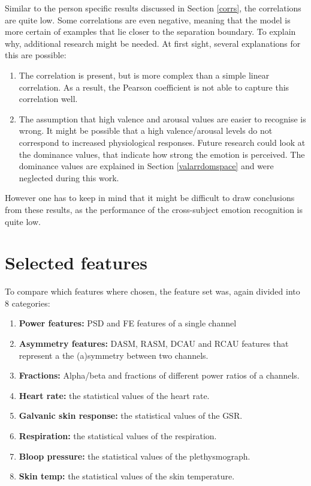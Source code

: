 Similar to the person specific results discussed in Section \ref{corrs}, the correlations are quite low. Some correlations are even negative, meaning that the model is more certain of examples that lie closer to the separation boundary. To explain why, additional research might be needed. At first sight, several explanations for this are possible:
\begin{enumerate}
\item The correlation is present, but is more complex than a simple linear correlation. As a result, the Pearson coefficient is not able to capture this correlation well.
\item The assumption that high valence and arousal values are easier to recognise is wrong. It might be possible that a high valence/arousal levels do not correspond to increased physiological responses. Future research could look at the dominance values, that indicate how strong the emotion is perceived. The dominance values are explained in Section \ref{valarrdomspace} and were neglected during this work.
\end{enumerate}
However one has to keep in mind that it might be difficult to draw conclusions from these results, as the performance of the cross-subject emotion recognition is quite low.

\section{Selected features}

To compare which features where chosen, the feature set was, again divided into 8 categories:
\begin{enumerate}
\item \textbf{Power features:} PSD and FE features of a single channel
\item \textbf{Asymmetry features:} DASM, RASM, DCAU and RCAU features that represent a the (a)symmetry between two channels.
\item \textbf{Fractions:} Alpha/beta and fractions of different power ratios of a channels.

\item \textbf{Heart rate:} the statistical values of the heart rate.
\item \textbf{Galvanic skin response:} the statistical values of the GSR.
\item \textbf{Respiration:} the statistical values of the respiration.
\item \textbf{Bloop pressure:} the statistical values of the plethysmograph.
\item \textbf{Skin temp:} the statistical values of the skin temperature.
\end{enumerate} 

